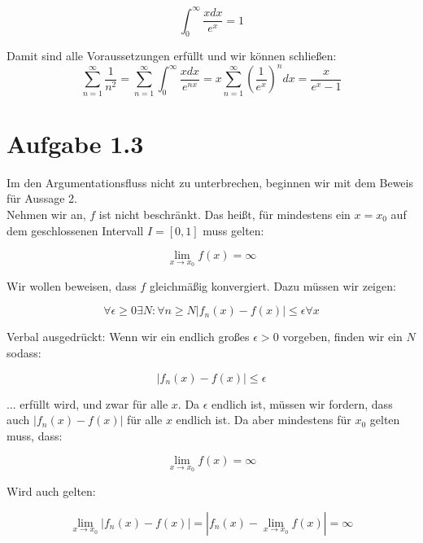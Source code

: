 \documentclass[a4paper,german,12pt,smallheadings]{scrartcl}
\begin{document}
\begin{equation*}
\int_{0}^{\infty}\frac{xdx}{e^x}=1
\end{equation*}

Damit sind alle Voraussetzungen erfüllt und wir können schließen:
\begin{equation*}
\sum_{n=1}^{\infty}\frac{1}{n^2}=\sum_{n=1}^{\infty}\int_{0}^{\infty}\frac{xdx}{e^{nx}}=x\sum_{n=1}^{\infty}\left(\frac{1}{e^x}\right)^ndx=\frac{x}{e^x-1}
\end{equation*}


\section*{Aufgabe 1.3}

Im den Argumentationsfluss nicht zu unterbrechen, beginnen wir mit dem Beweis für Aussage 2.\\
Nehmen wir an, $f$ ist nicht beschränkt. Das heißt, für mindestens ein $x=x_0$ auf dem geschlossenen Intervall $I=[0,1]$ muss gelten:

\begin{equation*}
\lim\limits_{x \to x_0} f(x)=\infty
\end{equation*}

 Wir wollen beweisen, dass $f$ gleichmäßig konvergiert. Dazu müssen wir zeigen:

\begin{equation*}
\forall \epsilon \ge 0 \exists N: \forall n \geq N |f_n(x)-f(x)| \le \epsilon \forall x
\end{equation*}

Verbal ausgedrückt: Wenn wir ein endlich großes $\epsilon>0$ vorgeben, finden wir ein $N$ sodass:

\begin{equation*}
|f_n(x)-f(x)| \le \epsilon 
\end{equation*}

... erfüllt wird, und zwar für alle $x$. Da $\epsilon$ endlich ist, müssen wir fordern, dass auch $|f_n(x)-f(x)|$ für alle $x$ endlich ist. Da aber mindestens für $x_0$ gelten muss, dass:

\begin{equation*}
\lim\limits_{x \to x_0} f(x)=\infty
\end{equation*}

Wird auch gelten:

\begin{equation*}
\lim\limits_{x \to x_0} |f_n(x)-f(x)|=|f_n(x)-\lim\limits_{x \to x_0} f(x)|=\infty
\end{equation*}
\end{document}

